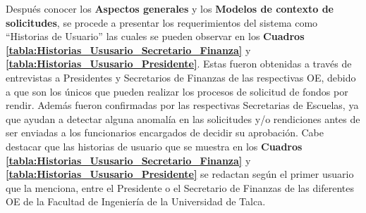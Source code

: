 Después conocer los \textbf{Aspectos generales} y los \textbf{Modelos de contexto de solicitudes}, se procede a presentar los requerimientos del sistema como ``Historias de Usuario'' las cuales se pueden observar en los \textbf{Cuadros \ref{tabla:Historias_Ususario_Secretario_Finanza}} y \textbf{\ref{tabla:Historias_Ususario_Presidente}}. Estas fueron obtenidas a través de entrevistas a Presidentes y Secretarios de Finanzas de las respectivas OE, debido a que son los únicos que pueden realizar los procesos de solicitud de fondos por rendir. Además fueron confirmadas por las respectivas Secretarias de Escuelas, ya que ayudan a detectar alguna anomalía en las solicitudes y/o rendiciones antes de ser enviadas a los funcionarios encargados de decidir su aprobación. Cabe destacar que las historias de usuario que se muestra en los \textbf{Cuadros \ref{tabla:Historias_Ususario_Secretario_Finanza}} y \textbf{\ref{tabla:Historias_Ususario_Presidente}} se redactan según el primer usuario que la menciona, entre el Presidente o el Secretario de Finanzas de las diferentes OE de la Facultad de Ingeniería de la Universidad de Talca.

